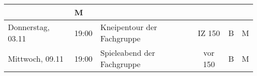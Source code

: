 \begin{tabular}{|l|l|p{6.7cm}|c|c|c|}
& M\\
\hline Donnerstag, 03.11 & 19:00 & Kneipentour der Fachgruppe & IZ 150 & B & M\\
\hline Mittwoch, 09.11 & 19:00 & Spieleabend der Fachgruppe & vor  150 & B & M\\
\hline
\end{tabular} 

